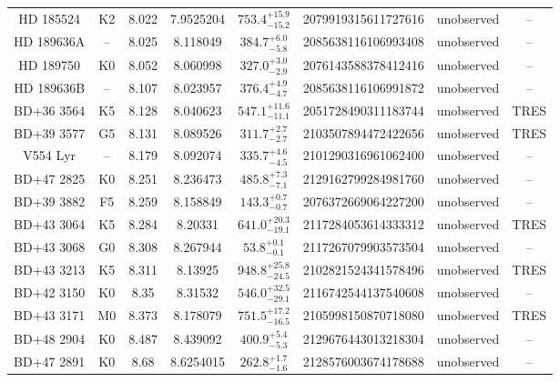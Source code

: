 \begin{table*}
\begin{tabular}{cccccccc}
HD 185524 & K2 & 8.022 & 7.9525204 & $753.4^{+15.9}_{-15.2}$ & 2079919315611727616 & unobserved & -- \\
HD 189636A & -- & 8.025 & 8.118049 & $384.7^{+6.0}_{-5.8}$ & 2085638116106993408 & unobserved & -- \\
HD 189750 & K0 & 8.052 & 8.060998 & $327.0^{+3.0}_{-2.9}$ & 2076143588378412416 & unobserved & -- \\
HD 189636B & -- & 8.107 & 8.023957 & $376.4^{+4.9}_{-4.7}$ & 2085638116106991872 & unobserved & -- \\
BD+36 3564 & K5 & 8.128 & 8.040623 & $547.1^{+11.6}_{-11.1}$ & 2051728490311183744 & unobserved & TRES \\
BD+39 3577 & G5 & 8.131 & 8.089526 & $311.7^{+2.7}_{-2.7}$ & 2103507894472422656 & unobserved & TRES \\
V554 Lyr & -- & 8.179 & 8.092074 & $335.7^{+4.6}_{-4.5}$ & 2101290316961062400 & unobserved & -- \\
BD+47 2825 & K0 & 8.251 & 8.236473 & $485.8^{+7.3}_{-7.1}$ & 2129162799284981760 & unobserved & -- \\
BD+39 3882 & F5 & 8.259 & 8.158849 & $143.3^{+0.7}_{-0.7}$ & 2076372669064227200 & unobserved & -- \\
BD+43 3064 & K5 & 8.284 & 8.20331 & $641.0^{+20.3}_{-19.1}$ & 2117284053614333312 & unobserved & TRES \\
BD+43 3068 & G0 & 8.308 & 8.267944 & $53.8^{+0.1}_{-0.1}$ & 2117267079903573504 & unobserved & -- \\
BD+43 3213 & K5 & 8.311 & 8.13925 & $948.8^{+25.8}_{-24.5}$ & 2102821524341578496 & unobserved & TRES \\
BD+42 3150 & K0 & 8.35 & 8.31532 & $546.0^{+32.5}_{-29.1}$ & 2116742544137540608 & unobserved & -- \\
BD+43 3171 & M0 & 8.373 & 8.178079 & $751.5^{+17.2}_{-16.5}$ & 2105998150870718080 & unobserved & TRES \\
BD+48 2904 & K0 & 8.487 & 8.439092 & $400.9^{+5.4}_{-5.3}$ & 2129676443013218304 & unobserved & -- \\
BD+47 2891 & K0 & 8.68 & 8.6254015 & $262.8^{+1.7}_{-1.6}$ & 2128576003674178688 & unobserved & -- \\
\hline
\end{tabular}
\end{table*}
